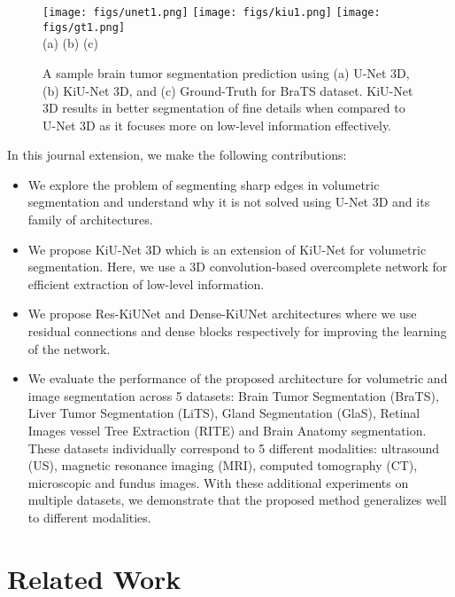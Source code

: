 \documentclass[journal,twoside,web]{ieeecolor}
\begin{document}
\begin{figure}[t!]
	\begin{center}
		\centering
		\texttt{[image: figs/unet1.png]}
		\texttt{[image: figs/kiu1.png]}
		\texttt{[image: figs/gt1.png]} \\
		(a) \hskip65pt (b) \hskip65pt (c)
		\caption{A sample brain tumor segmentation prediction using (a) U-Net 3D, (b) KiU-Net 3D, and (c) Ground-Truth for BraTS dataset. KiU-Net 3D results in better segmentation of fine details when compared to U-Net 3D as it focuses more on low-level information effectively.}
		\label{Fig:first}
	\end{center}
\end{figure}
In this journal extension, we make the following contributions: 
\begin{itemize}
	\item We explore the problem of segmenting sharp edges in volumetric segmentation and understand why it is not solved using U-Net 3D and its family of architectures.      
	\item We propose KiU-Net 3D which is an extension of KiU-Net for volumetric segmentation.  Here, we use a 3D convolution-based overcomplete network for efficient extraction of low-level information. 
	\item We propose Res-KiUNet and Dense-KiUNet architectures where we use residual connections and dense blocks respectively for improving the learning of the network.
	\item We evaluate the performance of the proposed architecture  for volumetric and image segmentation across 5 datasets: Brain Tumor Segmentation (BraTS), Liver Tumor Segmentation (LiTS), Gland Segmentation (GlaS), Retinal Images vessel Tree Extraction (RITE) and Brain Anatomy segmentation. These datasets individually correspond to 5 different modalities: ultrasound (US), magnetic resonance imaging (MRI), computed tomography (CT), microscopic and fundus images. With these additional experiments on multiple datasets, we demonstrate   that the proposed method generalizes well to different modalities.
	
\end{itemize}






\section{Related Work}
\end{document}
